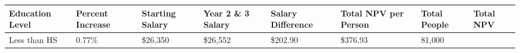 \documentclass[11pt]{article}
\begin{document}
\begin{longtable}[]{@{}llllllll@{}}
\toprule
\begin{minipage}[b]{0.13\columnwidth}\raggedright
Education Level\strut
\end{minipage} & \begin{minipage}[b]{0.14\columnwidth}\raggedright
Percent Increase\strut
\end{minipage} & \begin{minipage}[b]{0.09\columnwidth}\raggedright
Starting Salary\strut
\end{minipage} & \begin{minipage}[b]{0.09\columnwidth}\raggedright
Year 2 \& 3 Salary\strut
\end{minipage} & \begin{minipage}[b]{0.08\columnwidth}\raggedright
Salary Difference\strut
\end{minipage} & \begin{minipage}[b]{0.08\columnwidth}\raggedright
Total NPV per Person\strut
\end{minipage} & \begin{minipage}[b]{0.08\columnwidth}\raggedright
Total People\strut
\end{minipage} & \begin{minipage}[b]{0.08\columnwidth}\raggedright
Total NPV\strut
\end{minipage}\tabularnewline
\midrule
\endhead
\begin{minipage}[t]{0.13\columnwidth}\raggedright
Less than HS\strut
\end{minipage} & \begin{minipage}[t]{0.14\columnwidth}\raggedright
0.77\%\strut
\end{minipage} & \begin{minipage}[t]{0.09\columnwidth}\raggedright
\$26,350\strut
\end{minipage} & \begin{minipage}[t]{0.09\columnwidth}\raggedright
\$26,552\strut
\end{minipage} & \begin{minipage}[t]{0.08\columnwidth}\raggedright
\$202.90\strut
\end{minipage} & \begin{minipage}[t]{0.08\columnwidth}\raggedright
\$376.93\strut
\end{minipage} & \begin{minipage}[t]{0.08\columnwidth}\raggedright
81,000\strut
\end{minipage} & \begin{minipage}[t]{0.08\columnwidth}\raggedright

\end{minipage}
\end{longtable}
\end{document}
